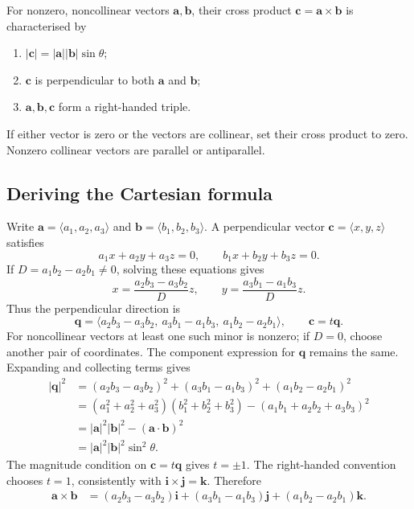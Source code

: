 \begin{definition}
For nonzero, noncollinear vectors $\mathbf a,\mathbf b$, their cross product
$\mathbf c=\mathbf a\times\mathbf b$ is characterised by
\begin{enumerate}
 \item $|\mathbf c|=|\mathbf a||\mathbf b|\sin\theta$;
 \item $\mathbf c$ is perpendicular to both $\mathbf a$ and $\mathbf b$;
 \item $\mathbf a,\mathbf b,\mathbf c$ form a right-handed triple.
\end{enumerate}
If either vector is zero or the vectors are collinear, set their cross product
to zero. Nonzero collinear vectors are parallel or antiparallel.
\end{definition}

\subsection{Deriving the Cartesian formula}
Write $\mathbf a=\langle a_1,a_2,a_3\rangle$ and
$\mathbf b=\langle b_1,b_2,b_3\rangle$.
A perpendicular vector $\mathbf c=\langle x,y,z\rangle$ satisfies
\[
 a_1x+a_2y+a_3z=0,\qquad b_1x+b_2y+b_3z=0.
\]
If $D=a_1b_2-a_2b_1\ne0$, solving these equations gives
\[
 x=\frac{a_2b_3-a_3b_2}{D}z,\qquad
 y=\frac{a_3b_1-a_1b_3}{D}z.
\]
Thus the perpendicular direction is
\[
 \mathbf q=\langle a_2b_3-a_3b_2,\ a_3b_1-a_1b_3,\ a_1b_2-a_2b_1\rangle,
 \qquad\mathbf c=t\mathbf q.
\]
For noncollinear vectors at least one such minor is nonzero; if $D=0$,
choose another pair of coordinates. The component expression for $\mathbf q$
remains the same. Expanding and collecting terms gives
\begin{align*}
 |\mathbf q|^2
 &=(a_2b_3-a_3b_2)^2+(a_3b_1-a_1b_3)^2+(a_1b_2-a_2b_1)^2\\
 &=(a_1^2+a_2^2+a_3^2)(b_1^2+b_2^2+b_3^2)
   -(a_1b_1+a_2b_2+a_3b_3)^2\\
 &=|\mathbf a|^2|\mathbf b|^2-(\mathbf a\cdot\mathbf b)^2\\
 &=|\mathbf a|^2|\mathbf b|^2\sin^2\theta.
\end{align*}
The magnitude condition on $\mathbf c=t\mathbf q$ gives $t=\pm1$.
The right-handed convention chooses $t=1$, consistently with
$\mathbf i\times\mathbf j=\mathbf k$.
Therefore
\begin{align*}
 \mathbf a\times\mathbf b
 &=(a_2b_3-a_3b_2)\mathbf i
 +(a_3b_1-a_1b_3)\mathbf j
 +(a_1b_2-a_2b_1)\mathbf k.
\end{align*}

